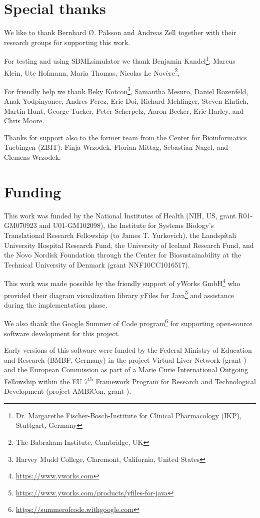 \section{Special thanks}

We like to thank Bernhard \O. Palsson and Andreas Zell together with their research groups for supporting this work.

For testing and using SBMLsimulator we thank
Benjamin Kandel\footnote{Dr. Margarethe Fischer-Bosch-Institute for Clinical Pharmacology (IKP), Stuttgart, Germany\label{fn:ikp}},
Marcus Klein,
Ute Hofmann,
Maria Thomas,
Nicolas Le Nov\`{e}re\footnote{The Babraham Institute, Cambridge, UK\label{fn:babraham}},

For friendly help we thank Beky Kotcon\footnote{Harvey Mudd College, Claremont, California, United States\label{fn:harvey}}, Samantha Mesuro, Daniel Rozenfeld, Anak Yodpinyanee, Andres Perez, Eric Doi, Richard Mehlinger, Steven Ehrlich, Martin Hunt, George Tucker, Peter Scherpelz, Aaron Becker, Eric Harley, and Chris Moore.

Thanks for support also to the former team from the Center for Bioinformatics Tuebingen (ZBIT): Finja Wrzodek, Florian Mittag, Sebastian Nagel, and Clemens Wrzodek.

\section{Funding}

This work was funded by the National Institutes of Health (NIH, US, grant \numero R01-GM070923 and U01-GM102098), the Institute for Systems Biology's Translational Research Fellowship (to James T. Yurkovich), the Landsp\'itali University Hospital Research Fund, the University of Iceland Research Fund, and the Novo Nordisk Foundation through the Center for Biosustainability at the Technical University of Denmark (grant \numero NNF10CC1016517).

This work was made possible by the friendly support of yWorks GmbH\footnote{\url{https://www.yworks.com}} who provided their diagram visualization library yFiles for Java\texttrademark\footnote{\url{https://www.yworks.com/products/yfiles-for-java}} and assistance during the implementation phase.

We also thank the Google Summer of Code program\footnote{\url{https://summerofcode.withgoogle.com}} for supporting open-source software development for this project.

Early versions of this software were funded by the Federal Ministry of Education and Research (BMBF, Germany) in the project Virtual Liver Network (grant ) and the European Commission as part of a Marie Curie International Outgoing Fellowship within the EU 7\textsuperscript{th} Framework Program for Research and Technological Development (project AMBiCon, grant ).
